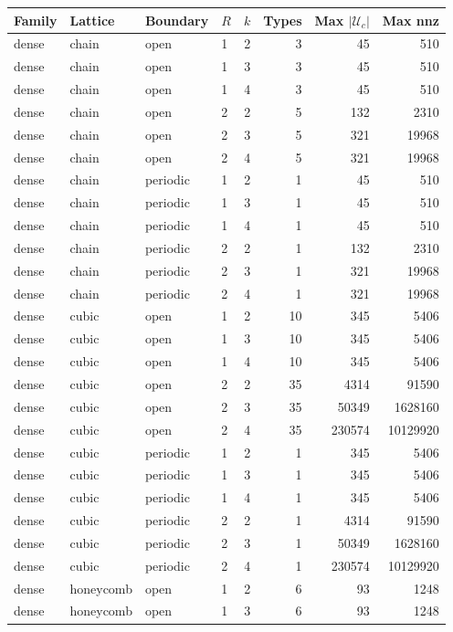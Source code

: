 \begin{table}
\centering
\begin{tabular}{llllrrrr}
Family & Lattice & Boundary & $R$ & $k$ & Types & Max $|\mathcal U_c|$ & Max nnz \\
\hline
dense & chain & open & 1 & 2 & 3 & 45 & 510 \\
dense & chain & open & 1 & 3 & 3 & 45 & 510 \\
dense & chain & open & 1 & 4 & 3 & 45 & 510 \\
dense & chain & open & 2 & 2 & 5 & 132 & 2310 \\
dense & chain & open & 2 & 3 & 5 & 321 & 19968 \\
dense & chain & open & 2 & 4 & 5 & 321 & 19968 \\
dense & chain & periodic & 1 & 2 & 1 & 45 & 510 \\
dense & chain & periodic & 1 & 3 & 1 & 45 & 510 \\
dense & chain & periodic & 1 & 4 & 1 & 45 & 510 \\
dense & chain & periodic & 2 & 2 & 1 & 132 & 2310 \\
dense & chain & periodic & 2 & 3 & 1 & 321 & 19968 \\
dense & chain & periodic & 2 & 4 & 1 & 321 & 19968 \\
dense & cubic & open & 1 & 2 & 10 & 345 & 5406 \\
dense & cubic & open & 1 & 3 & 10 & 345 & 5406 \\
dense & cubic & open & 1 & 4 & 10 & 345 & 5406 \\
dense & cubic & open & 2 & 2 & 35 & 4314 & 91590 \\
dense & cubic & open & 2 & 3 & 35 & 50349 & 1628160 \\
dense & cubic & open & 2 & 4 & 35 & 230574 & 10129920 \\
dense & cubic & periodic & 1 & 2 & 1 & 345 & 5406 \\
dense & cubic & periodic & 1 & 3 & 1 & 345 & 5406 \\
dense & cubic & periodic & 1 & 4 & 1 & 345 & 5406 \\
dense & cubic & periodic & 2 & 2 & 1 & 4314 & 91590 \\
dense & cubic & periodic & 2 & 3 & 1 & 50349 & 1628160 \\
dense & cubic & periodic & 2 & 4 & 1 & 230574 & 10129920 \\
dense & honeycomb & open & 1 & 2 & 6 & 93 & 1248 \\
dense & honeycomb & open & 1 & 3 & 6 & 93 & 1248 \\

\end{tabular}
\end{table}
